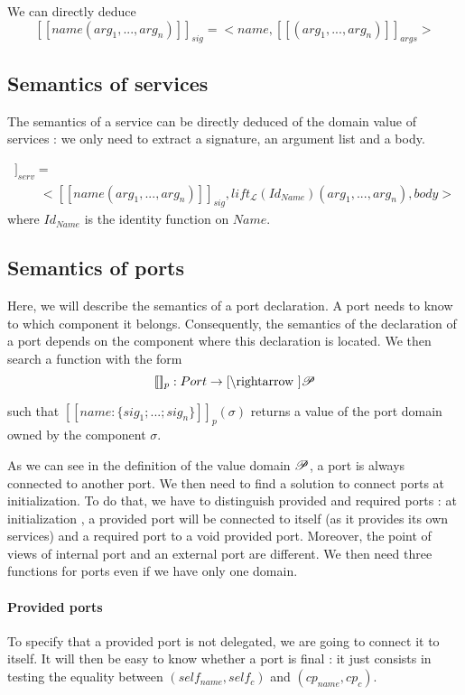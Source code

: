 We can directly deduce
\[[\![name(arg_1,...,arg_n)]\!]_{sig} = <name, [\![(arg_1,...,arg_n)]\!]_{args}> \]

\subsection{Semantics of services}
The semantics of a service can be directly deduced of the domain value of services : we only need to extract a signature, an argument list and a body.

\begin{multline*}
[\![\textbf{service}~name(arg_1,...,arg_n)\{
	body
	\}
]\!]_{serv}=\\
\qquad  <[\![name(arg_1,...,arg_n)]\!]_{sig}, lift_{\mathcal{L}}(Id_{Name})(arg_1,...,arg_n), body>
\end{multline*}
where $Id_{Name}$ is the identity function on $Name$.
\subsection{Semantics of ports}
Here, we will describe the semantics of a port declaration. A port needs to know to which component it belongs. Consequently, the semantics of the declaration of a port depends on the component where this declaration is located. We then search a function with the form
\[[\![]\!]_{p} : Port \rightarrow \Cref \rightarrow \Po\]

such that $[\![name:\{sig_1; ... ; sig_n\}]\!]_{p}(\sigma)$ returns a value of the port domain owned by the component $\sigma$.

As we can see in the definition of the value domain $\mathcal{P}$, a port is always connected to another port. We then need to find a solution to connect ports at initialization. To do that, we have to distinguish provided and required ports : at initialization , a provided port will be connected to itself (as it provides its own services) and a required port to a void provided port. Moreover, the point of views of internal port and an external port are different. We then need three functions for ports even if we have only one domain.

\paragraph{Provided ports} 
To specify that a provided port is not delegated, we are going to connect it to itself. It will then be easy to know whether a port is final : it just consists in testing the equality between $(self_{name}, self_c)$ and $(cp_{name}, cp_c)$.

